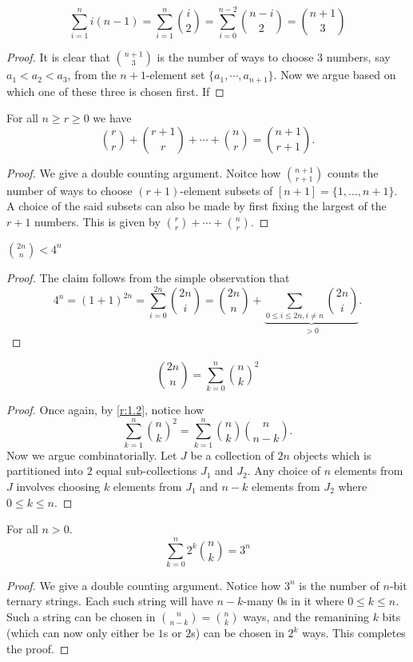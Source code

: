 \begin{claim}
\[
\sum_{i=1}^{n}i(n-1) = \sum_{i=1}^{n}\binom{i}{2} = \sum_{i=0}^{n-2}\binom{n-i}{2} = \binom{n+1}{3} 
\]
\end{claim}
\begin{proof}
It is clear that $\binom{n+1}{3}$ is the number of ways to choose $3$ numbers, say $a_{1}<a_{2}<a_{3}$, from the $n+1$-element set $\{a_1,\cdots,a_{n+1}\}$. Now we argue based on which one of these three is chosen first. If 
\end{proof}
\begin{claim}
For all $n\geq r\geq 0$ we have 
\[
\binom{r}{r}+\binom{r+1}{r}+\cdots+\binom{n}{r} = \binom{n+1}{r+1}
.\] 
\end{claim}
\begin{proof}
We give a double counting argument. Noitce how $\binom{n+1}{r+1}$ counts the number of ways to choose $(r+1)$-element subsets of $[n+1]=\{1,\ldots,n+1\}$. A choice of the said subsets can also be made by first fixing the largest of the $r+1$ numbers. This is given by $\binom{r}{r}+\cdots+\binom{n}{r}$. 
\end{proof}
\begin{claim}
$\binom{2n}{n}<4^n$
\end{claim}
\begin{proof}
The claim follows from the simple observation that \[
4^{n} = (1+1)^{2n} = \sum_{i=0}^{2n} \binom{2n}{i} = \binom{2n}{n}+\underbrace{\sum_{0\leq i\leq 2n, i\neq n} \binom{2n}{i}}_{>0}. 
\]
\end{proof}
\begin{claim}
\[\binom{2n}{n} = \sum_{k=0}^{n} \binom{n}{k}^2\]
\end{claim}
\begin{proof}
Once again, by \cref{r:1.2}, notice how \[
\sum_{k=1}^n\binom{n}{k}^2 = \sum_{k=1}^{n}\binom{n}{k}\binom{n}{n-k}.
\] Now we argue combinatorially. Let $J$ be a collection of $2n$ objects which is partitioned into $2$ equal sub-collections $J_1$ and $J_2$. Any choice of $n$ elements from $J$ involves choosing $k$ elements from $J_1$ and $n-k$ elements from $J_2$ where $0\leq k\leq n$. 
\end{proof}
\begin{claim}
	For all $n>0$. \[
		\sum_{k=0}^{n} 2^k\binom{n}{k} = 3^n
	\]
\end{claim}
\begin{proof}
We give a double counting argument. Notice how $3^n$ is the number of $n$-bit ternary strings. Each such string will have $n-k$-many $0$s in it where $0\leq k \leq n$. Such a string can be chosen in $\binom{n}{n-k}=\binom{n}{k}$ ways, and the remanining $k$ bits (which can now only either be $1$s or $2$s) can be chosen in $2^k$ ways. This completes the proof. 
\end{proof}
